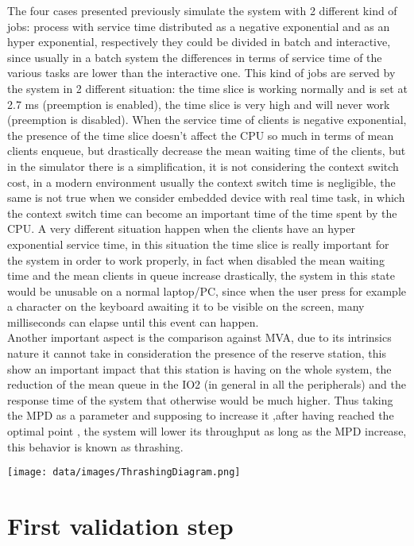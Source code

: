 \documentclass[12pt,a4paper]{article}
\begin{document}
The four cases presented previously simulate the system with 2 different kind of jobs: process with service time distributed as a negative exponential and as an hyper exponential, respectively they could be divided in batch and interactive, since usually in a batch system the differences in terms of service time of the various tasks are lower than the interactive one. This kind of jobs are served by the system in 2 different situation: the time slice is working normally and is set at 2.7 ms (preemption is enabled), the time slice is very high and will never work (preemption is disabled). When the service time of clients is negative exponential, the presence of the time slice doesn't affect the CPU so much in terms of mean clients enqueue, but drastically decrease the mean waiting time of the clients, but in the simulator there is a simplification, it is not considering the context switch cost, in a modern environment usually the context switch time is negligible, the same is not true when we consider embedded device with real time task, in which the context switch time can become an important time of the time spent by the CPU.
A very different situation happen when the clients have an hyper exponential service time, in this situation the time slice is really important for the system in order to work properly, in fact when disabled the mean waiting time and the mean clients in queue increase drastically, the system in this state would be unusable on a normal laptop/PC, since when the user press for example a character on the keyboard awaiting it to be visible on the screen, many milliseconds can elapse until this event can happen.\\
Another important aspect is the comparison against MVA, due to its intrinsics nature it cannot take in consideration the presence of the reserve station, this show an important impact that this station is having on the whole system, the reduction of the mean queue in the IO2 (in general in all the peripherals) and the response time of the system that otherwise would be much higher. Thus taking the MPD as a parameter and supposing to increase it ,after having reached the optimal point , the system will lower its throughput as long as the MPD increase, this behavior is known as thrashing.

\texttt{[image: data/images/ThrashingDiagram.png]}


\section{First validation step}
\end{document}
